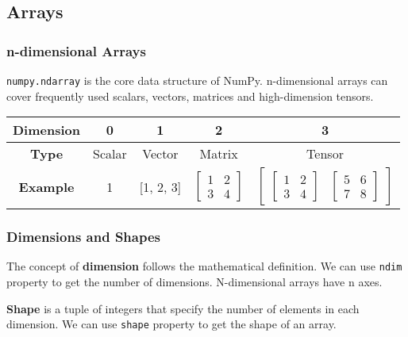 \documentclass[beamer, en, version=2.0]{huangfusl-template}
\begin{document}
    \subsection{Arrays}
    \begin{frame}[fragile]
        \frametitle{n-dimensional Arrays}

        {\color{blue}\footnotesize\verb|numpy.ndarray|} is the core data structure of NumPy. n-dimensional arrays can cover frequently used scalars, vectors, matrices and high-dimension tensors.

        \begin{table}[h]
            \centering
            \begin{tabular}{ccccc}
                \toprule
                \textbf{Dimension} & 0 & 1 & 2 & 3 \\
                \midrule
                \textbf{Type} & Scalar & Vector & Matrix & Tensor \\
                \textbf{Example} & 1 & [1, 2, 3] & $\begin{bmatrix} 1 & 2 \\ 3 & 4 \end{bmatrix}$ & $\begin{bmatrix} \begin{bmatrix} 1 & 2 \\ 3 & 4 \end{bmatrix} & \begin{bmatrix} 5 & 6 \\ 7 & 8 \end{bmatrix} \end{bmatrix}$ \\
                \bottomrule
            \end{tabular}
        \end{table}
    \end{frame}
    \begin{frame}[fragile]
        \frametitle{Dimensions and Shapes}

        The concept of \textbf{dimension} follows the mathematical definition. We can use {\color{blue}\footnotesize\verb|ndim|} property to get the number of dimensions. N-dimensional arrays have n axes.

        \textbf{Shape} is a tuple of integers that specify the number of elements in each dimension. We can use {\color{blue}\footnotesize\verb|shape|} property to get the shape of an array.

    \end{frame}
\end{document}
